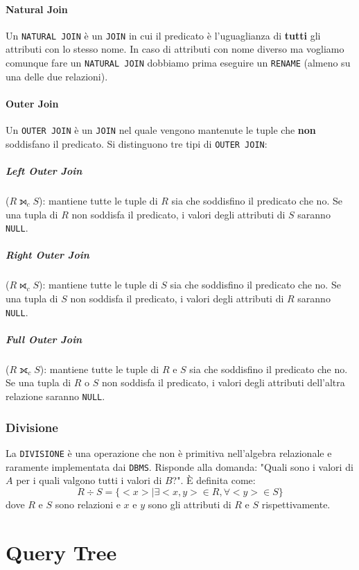             \paragraph{Natural Join} Un \texttt{NATURAL JOIN} è un \texttt{JOIN} in cui il predicato è l'uguaglianza di \textbf{tutti} gli attributi con lo stesso nome. In caso di attributi con nome diverso ma vogliamo comunque fare un \texttt{NATURAL JOIN} dobbiamo prima eseguire un \texttt{RENAME} (almeno su una delle due relazioni). 
            \paragraph{Outer Join} Un \texttt{OUTER JOIN} è un \texttt{JOIN} nel quale vengono mantenute le tuple che \textbf{non} soddisfano il predicato. Si distinguono tre tipi di \texttt{OUTER JOIN}:
                \subparagraph{Left Outer Join} ($ R \leftouterjoin_c S $): mantiene tutte le tuple di $ R $ sia che soddisfino il predicato che no. Se una tupla di $ R $ non soddisfa il predicato, i valori degli attributi di $ S $ saranno \texttt{NULL}.
                \subparagraph{Right Outer Join} ($ R \rightouterjoin_c S $): mantiene tutte le tuple di $ S $ sia che soddisfino il predicato che no. Se una tupla di $ S $ non soddisfa il predicato, i valori degli attributi di $ R $ saranno \texttt{NULL}.
                \subparagraph{Full Outer Join} ($ R \fullouterjoin_c S $): mantiene tutte le tuple di $ R $ e $ S $ sia che soddisfino il predicato che no. Se una tupla di $ R $ o $ S $ non soddisfa il predicato, i valori degli attributi dell'altra relazione saranno \texttt{NULL}.
        \subsubsection{Divisione}
            La \texttt{DIVISIONE} è una operazione che non è primitiva nell'algebra relazionale e raramente implementata dai \texttt{DBMS}. Risponde alla domanda: "Quali sono i valori di $ A $ per i quali valgono tutti i valori di $ B $?". È definita come:
            $$
                R \div S = \{ <x>|\exists <x,y>\in R, \forall <y> \in S \}
            $$
            dove $ R $ e $ S $ sono relazioni e $ x $ e $ y $ sono gli attributi di $ R $ e $ S $ rispettivamente.
\section{Query Tree}
    
